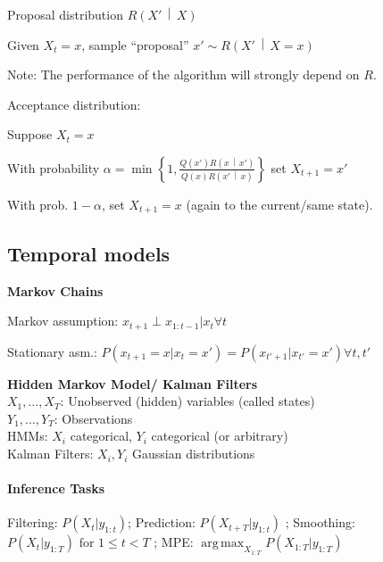 \documentclass[a4paper, 10pt]{scrartcl}
\newcommand{\set}[1]{\left\{ #1 \right\}}
\newcommand{\Dist}[2]{#1\left( #2 \right)}
\newcommand{\cDist}[3]{#1\left( #2 \,\middle|\, #3 \right)}
\DeclareMathOperator*{\argmax}{arg\,max}
\begin{document}
\begin{multicols*}{3}
\begin{compactenum}
  \item Proposal distribution $\cDist{R}{X'}{X}$
  \begin{compactitem}
    \item Given $X_t=x$, sample ``proposal'' $x'\sim \cDist{R}{X'}{X=x}$
    \item Note: The performance of the algorithm will strongly depend on $R$.
  \end{compactitem}
  \item Acceptance distribution:
  \begin{compactitem}
    \item Suppose $X_t=x$
    \item With probability
    $
    \alpha =
    \min\set{1,\frac{\Dist{Q}{x'}\cDist{R}{x}{x'}}{\Dist{Q}{x}\cDist{R}{x'}{x}}}
    $
    set $X_{t+1}=x'$
    \item With prob. $1-\alpha$, set $X_{t+1}=x$ (again to the
    current/same state).
  \end{compactitem}
\end{compactenum}

\subsection{Temporal models}

\textbf{Markov Chains}

Markov assumption: $x_{t+1} \perp x_{1:t-1} | x_t \forall t$

Stationary asm.: $P(x_{t+1} = x | x_t = x') = P(x_{t'+1} | x_{t'} = x') \forall t, t'$

\textbf{Hidden Markov Model/ Kalman Filters}\\
$X_1,\dots,X_T$: Unobserved (hidden) variables (called states) \\
$Y_1,\dots,Y_T$: Observations \\
HMMs: $X_i$ categorical, $Y_i$ categorical (or arbitrary)\\
Kalman Filters: $X_i, Y_i$ Gaussian distributions

\paragraph{Inference Tasks}

Filtering: $P(X_t | y_{1:t} ) $; Prediction: $P(X_{t+T} | y_{1:t} )$ ; Smoothing: $P(X_t | y_{1:T}) \text{ for } 1\leq t < T$ ; MPE: $\argmax_{X_{1:T}} P(X_{1:T} | y_{1:T})$


\end{multicols*}
\end{document}
